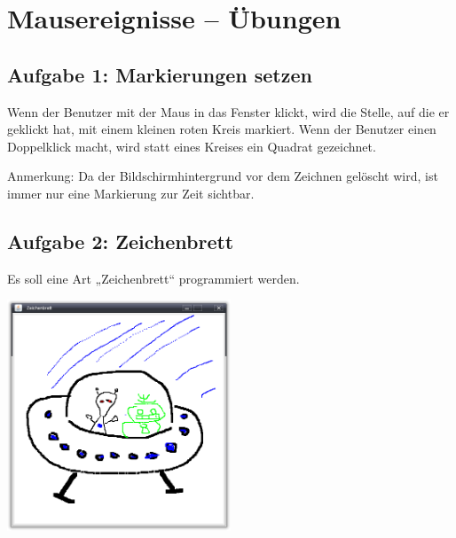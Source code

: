 \clearpage

\rehead[]{\textcolor{lightblue}{AvHG, Inf, My}}
\lohead[]{\textcolor{lightblue}{AvHG, Inf, My}}

\section{Mausereignisse -- Übungen}

\subsection{Aufgabe 1: Markierungen setzen}

Wenn der Benutzer mit der Maus in das Fenster klickt, wird die Stelle, auf die
er geklickt hat, mit einem kleinen roten Kreis markiert. Wenn der Benutzer
einen Doppelklick macht, wird statt eines Kreises ein Quadrat gezeichnet.

Anmerkung: Da der Bildschirmhintergrund vor dem Zeichnen gelöscht wird, ist
immer nur eine Markierung zur Zeit sichtbar.


\subsection{Aufgabe 2: Zeichenbrett}

Es soll eine Art „Zeichenbrett“ programmiert werden.

\begin{center}
\includegraphics[width=0.5\textwidth]{./inf/SEKII/22_Java_Mausereignisse/Zeichenbrett.png}
\end{center}

